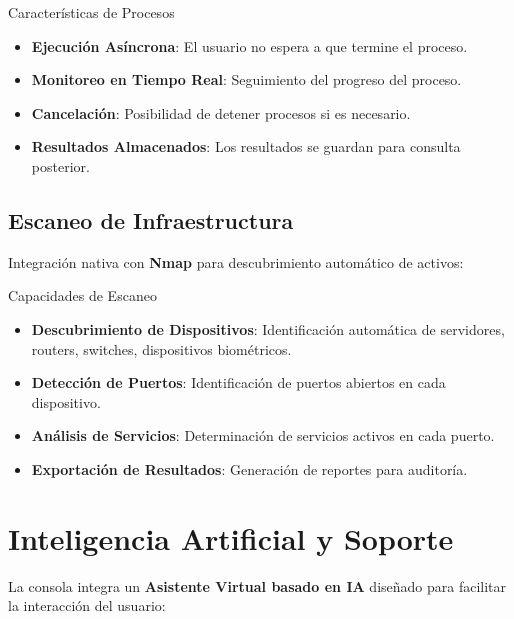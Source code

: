 \begin{caja}{Características de Procesos}
\begin{itemize}
\item \textbf{Ejecución Asíncrona}: El usuario no espera a que termine el proceso.
\item \textbf{Monitoreo en Tiempo Real}: Seguimiento del progreso del proceso.
\item \textbf{Cancelación}: Posibilidad de detener procesos si es necesario.
\item \textbf{Resultados Almacenados}: Los resultados se guardan para consulta posterior.
\end{itemize}
\end{caja}


\subsection{Escaneo de Infraestructura}

Integración nativa con \textbf{Nmap} para descubrimiento automático de activos:

\begin{caja}{Capacidades de Escaneo}
\begin{itemize}
\item \textbf{Descubrimiento de Dispositivos}: Identificación automática de servidores, routers, switches, dispositivos biométricos.
\item \textbf{Detección de Puertos}: Identificación de puertos abiertos en cada dispositivo.
\item \textbf{Análisis de Servicios}: Determinación de servicios activos en cada puerto.
\item \textbf{Exportación de Resultados}: Generación de reportes para auditoría.
\end{itemize}
\end{caja}


\section{Inteligencia Artificial y Soporte}

La consola integra un \textbf{Asistente Virtual basado en IA} diseñado para facilitar la interacción del usuario:

